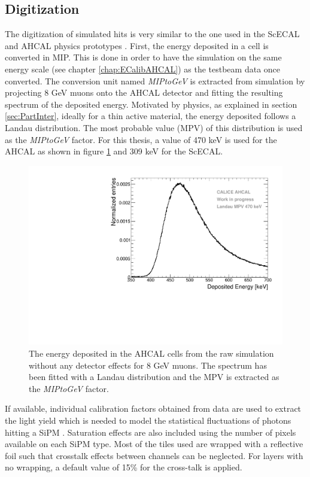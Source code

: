 \subsection{Digitization}
\label{subsec:Digitization}

The digitization of simulated hits is very similar to the one used in the ScECAL and AHCAL physics prototypes \cite{2011_JINST_6_P04003}. First, the energy deposited in a cell is converted in MIP. This is done in order to have the simulation on the same energy scale (see chapter \ref{chap:ECalibAHCAL}) as the testbeam data once converted. The conversion unit named \textit{MIPtoGeV} is extracted from simulation by projecting 8 GeV muons onto the AHCAL detector and fitting the resulting spectrum of the deposited energy. Motivated by physics, as explained in section \ref{sec:PartInter}, ideally for a thin active material, the energy deposited follows a Landau distribution. The most probable value (MPV) of this distribution is used as the \textit{MIPtoGeV} factor. For this thesis, a value of 470 keV is used for the AHCAL as shown in figure \ref{fig:landau_MPV} and 309 keV for the ScECAL.

\begin{figure}[htbp!]
  \centering
  \includegraphics[width=0.5\linewidth]{chap4/fig/Landau_mu_HCAL.pdf}
  \caption{The energy deposited in the AHCAL cells from the raw simulation without any detector effects for 8 GeV muons. The spectrum has been fitted with a Landau distribution and the MPV is extracted as the \textit{MIPtoGeV} factor.} \label{fig:landau_MPV}
\end{figure}

If available, individual calibration factors obtained from data are used to extract the light yield which is needed to model the statistical fluctuations of photons hitting a SiPM \cite{Hartbrich:2016bbz}. Saturation effects are also included using the number of pixels available on each SiPM type. Most of the tiles used are wrapped with a reflective foil such that crosstalk effects between channels can be neglected. For layers with no wrapping, a default value of 15\% for the cross-talk is applied.

